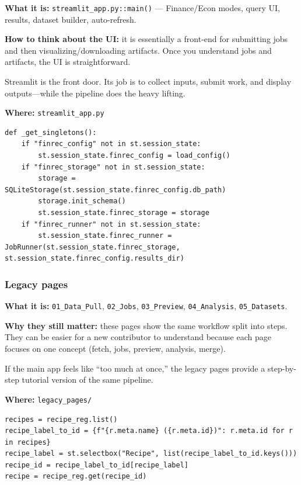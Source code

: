 \documentclass[11pt,a4paper]{article}
\begin{document}
\textbf{What it is:} \texttt{streamlit\_app.py::main()} --- Finance/Econ modes, query UI, results, dataset builder, auto-refresh.

\textbf{How to think about the UI:} it is essentially a front-end for submitting jobs and then visualizing/downloading artifacts. Once you understand jobs and artifacts, the UI is straightforward.

\begin{intuitionbox}
Streamlit is the front door. Its job is to collect inputs, submit work, and display outputs—while the pipeline does the heavy lifting.
\end{intuitionbox}

\textbf{Where:} \texttt{streamlit\_app.py}

\begin{lstlisting}
def _get_singletons():
    if "finrec_config" not in st.session_state:
        st.session_state.finrec_config = load_config()
    if "finrec_storage" not in st.session_state:
        storage = SQLiteStorage(st.session_state.finrec_config.db_path)
        storage.init_schema()
        st.session_state.finrec_storage = storage
    if "finrec_runner" not in st.session_state:
        st.session_state.finrec_runner = JobRunner(st.session_state.finrec_storage, st.session_state.finrec_config.results_dir)
\end{lstlisting}

\subsubsection{Legacy pages}\label{sec:legacy}

\textbf{What it is:} \texttt{01\_Data\_Pull}, \texttt{02\_Jobs}, \texttt{03\_Preview}, \texttt{04\_Analysis}, \texttt{05\_Datasets}.

\textbf{Why they still matter:} these pages show the same workflow split into steps. They can be easier for a new contributor to understand because each page focuses on one concept (fetch, jobs, preview, analysis, merge).

\begin{intuitionbox}
If the main app feels like ``too much at once,'' the legacy pages provide a step-by-step tutorial version of the same pipeline.
\end{intuitionbox}

\textbf{Where:} \texttt{legacy\_pages/}

\begin{lstlisting}
recipes = recipe_reg.list()
recipe_label_to_id = {f"{r.meta.name} ({r.meta.id})": r.meta.id for r in recipes}
recipe_label = st.selectbox("Recipe", list(recipe_label_to_id.keys()))
recipe_id = recipe_label_to_id[recipe_label]
recipe = recipe_reg.get(recipe_id)
\end{lstlisting}
\end{document}
